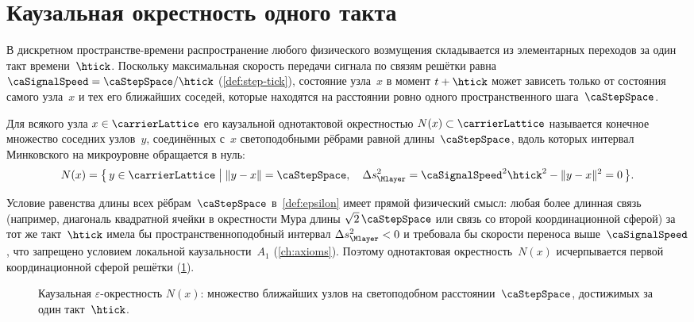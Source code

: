 \section{Каузальная окрестность одного такта}
\label{sec:epsilon}

В дискретном пространстве-времени распространение любого физического возмущения складывается из элементарных переходов за один такт времени~$\htick$.
Поскольку максимальная скорость передачи сигнала по связям решётки равна $\caSignalSpeed = \caStepSpace / \htick$ (\cref{def:step-tick}),
состояние узла~$x$ в момент $t + \htick$ может зависеть только от состояния самого узла~$x$ и тех его ближайших соседей, которые находятся на расстоянии ровно одного пространственного шага~$\caStepSpace$.

\begin{definition}
\label{def:epsilon}
Для всякого узла $x\in\carrierLattice$ его каузальной однотактовой окрестностью $N(x)\subset\carrierLattice$ называется конечное множество соседних узлов~$y$, соединённых с~$x$ светоподобными рёбрами равной длины~$\caStepSpace$, вдоль которых интервал Минковского на микроуровне обращается в нуль:
\[
  N(x) = \bigl\{\,y \in \carrierLattice \;\big|\; \|y - x\| = \caStepSpace,\quad \Delta s_{\Mlayer}^2 = \caSignalSpeed^2 \htick^2 - \|y - x\|^2 = 0\,\bigr\}.
\]
\end{definition}

Условие равенства длины всех рёбрам~$\caStepSpace$ в~\cref{def:epsilon} имеет прямой физический смысл:
любая более длинная связь (например, диагональ квадратной ячейки в окрестности Мура длины $\sqrt{2}\,\caStepSpace$ или связь со второй координационной сферой) за тот же такт~$\htick$ имела бы пространственноподобный интервал $\Delta s_{\Mlayer}^2 < 0$ и требовала бы скорости переноса выше~$\caSignalSpeed$, что запрещено условием локальной каузальности~$A_1$ (\cref{ch:axioms}).
Поэтому однотактовая окрестность~$N(x)$ исчерпывается первой координационной сферой решётки (\cref{fig:carrier-epsilon}).

\begin{figure}[htbp]
  \centering
  
  \caption{Каузальная $\varepsilon$-окрестность $N(x)$: множество ближайших узлов на светоподобном расстоянии~$\caStepSpace$, достижимых за один такт~$\htick$.}
  \label{fig:carrier-epsilon}
\end{figure}
